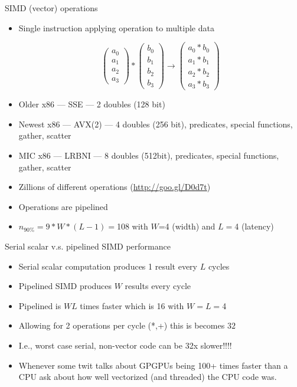 \begin{frame}{SIMD (vector) operations}
  \begin{itemize}
  \item Single instruction applying operation to multiple data

\[
  \begin{pmatrix}a_0\\a_1\\a_2\\a_3\end{pmatrix}
  *
  \begin{pmatrix}b_0\\b_1\\b_2\\b_3\end{pmatrix}
  \rightarrow 
  \begin{pmatrix}a_0 * b_0\\a_1*b_1\\a_2*b_2\\a_3*b_3\end{pmatrix}
\]

  \item Older x86 --- SSE --- 2 doubles (128 bit)
  \item Newest x86 --- AVX(2) --- 4 doubles (256 bit), predicates, special functions, gather, scatter
  \item MIC x86 --- LRBNI --- 8 doubles (512bit), predicates, special functions, gather, scatter
  \item Zillions of different operations (\url{http://goo.gl/D0d7t})
  \\
  \item Operations are pipelined 

  \item $n_{90\%} = 9*W*(L-1) =$108 with $W$=4 (width) and $L=$4 (latency)

  \end{itemize}
  
\end{frame}

\begin{frame}{Serial scalar v.s. pipelined SIMD performance}

  \begin{itemize}
  \item Serial scalar computation produces 1 result every $L$ cycles
  \item Pipelined SIMD produces $W$ results every cycle
  \item Pipelined is $W L$ times faster which is 16 with $W=L=$4
  \item Allowing for 2 operations per cycle (*,+) this is becomes $32$
  \item I.e., worst case serial, non-vector code can be 32x slower!!!!
  \\  
  
  \item Whenever some twit talks about GPGPUs being 100+ times faster
    than a CPU ask about how well vectorized (and threaded) the CPU
    code was.

  \end{itemize}

\end{frame}


